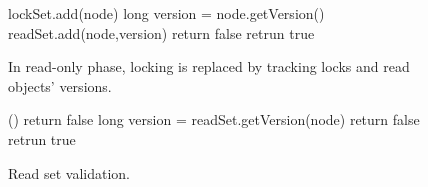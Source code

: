 \begin{figure}
\begin{algorithmic}[1]{}
		{\ttfamily
		\State lockSet.add(node) \label{code:lockedSet:add}
			\State long version = node.getVersion() \label{code:track:getVersion}
			\State readSet.add(node,version)  
				\State return false \label{code:track:returnFalse}
			\EndIf
			\State retrun true
		\EndFunction
		}
\end{algorithmic}
\caption{ In read-only phase, locking is replaced by 
tracking locks and read
objects' versions.
\label{figure::track}}
\end{figure}

\begin{figure}
\begin{algorithmic}[1]{}
		{\ttfamily
		()
				\State return false
			\EndIf
			\State long version = readSet.getVersion(node)
				\State return false
			\EndIf
		\EndFor
		\State retrun true
		\EndFunction
		}
\end{algorithmic}
\caption{Read set validation.\label{figure::validate}}
\end{figure}


